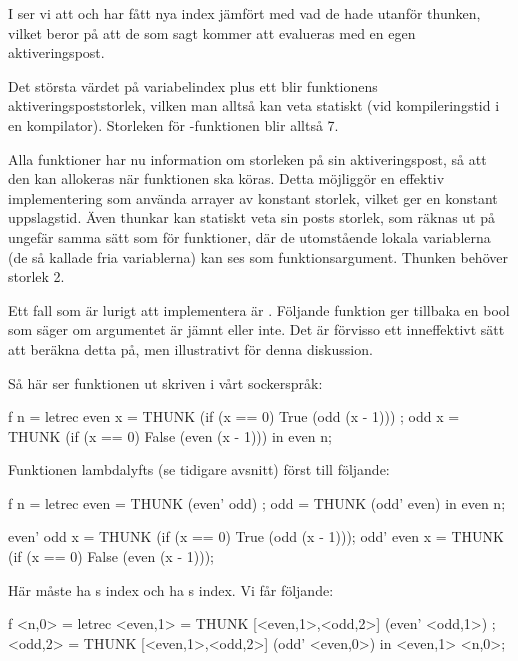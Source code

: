 \documentclass[../Core]{subfiles}
\begin{document}
I  ser vi att 
 och  har fått nya index jämfört med vad de
hade utanför thunken, vilket beror på att de som sagt kommer att evalueras
med en egen aktiveringspost.

Det största värdet på variabelindex plus ett blir funktionens
aktiveringspoststorlek, vilken man alltså kan veta statiskt
(vid kompileringstid i en kompilator). Storleken för -funktionen blir alltså 7.

Alla funktioner har nu information om storleken på sin aktiveringspost, så att 
den kan allokeras när funktionen ska köras.
Detta möjliggör en effektiv implementering som använda arrayer av konstant 
storlek, vilket ger en konstant uppslagstid.
Även thunkar kan statiskt veta sin posts storlek,
som räknas ut på ungefär samma sätt som
för funktioner, där de utomstående lokala variablerna (de så kallade fria 
variablerna) kan ses som funktionsargument.
Thunken  behöver storlek 2.

Ett fall som är lurigt att implementera är .
Följande funktion  ger tillbaka en bool som säger om 
argumentet  är jämnt eller inte. Det är förvisso ett
inneffektivt sätt att beräkna detta på, men illustrativt för denna diskussion.

Så här ser funktionen ut skriven i vårt sockerspråk:

\begin{codeEx}
f n = letrec 
    { even x = THUNK (if (x == 0) True  (odd  (x - 1)))
    ; odd  x = THUNK (if (x == 0) False (even (x - 1)))
    } in even n;
\end{codeEx}

Funktionen lambdalyfts (se tidigare avsnitt) först till följande:

\begin{codeEx}
f n = letrec 
    { even = THUNK (even' odd)
    ; odd  = THUNK (odd' even)
    } in even n;
    
even' odd x = THUNK (if (x == 0) True  (odd  (x - 1)));
odd' even x = THUNK (if (x == 0) False (even (x - 1)));
\end{codeEx}

Här måste  ha s index och  ha s index. Vi får följande:

\begin{codeEx}
f <n,0> = letrec 
    { <even,1> = THUNK [<even,1>,<odd,2>] (even' <odd,1>)
    ; <odd,2>  = THUNK [<even,1>,<odd,2>] (odd' <even,0>)
    } in <even,1> <n,0>;
\end{codeEx}
\end{document}

